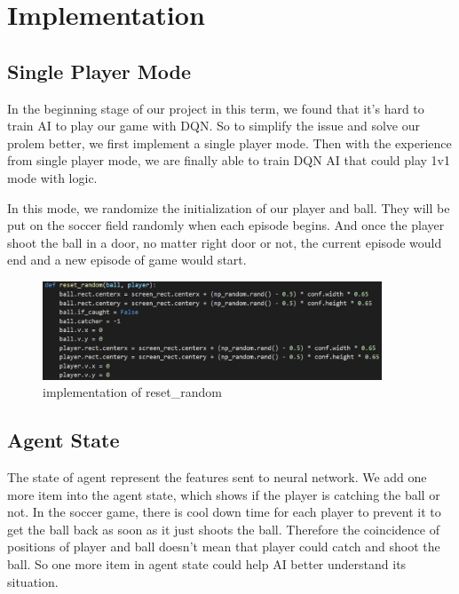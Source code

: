 \documentclass[12pt]{article}
\begin{document}

\section{Implementation}

\subsection{Single Player Mode}
In the beginning stage of our project in this term, we found that it's hard to train AI to play our game with DQN. So to simplify the issue and solve our prolem better, we first implement a single player mode. Then with the experience from single player mode, we are finally able to train DQN AI that could play 1v1 mode with logic.

In this mode, we randomize the initialization of our player and ball. They will be put on the soccer field randomly when each episode begins. And once the player shoot the ball in a door, no matter right door or not, the current episode would end and a new episode of game would start.
\begin{figure}[H]
	\begin{center}
		\includegraphics[width=0.9\textwidth]{reset_random}
		\caption{implementation of reset\_random}
	\end{center}
\end{figure}


\subsection{Agent State}
The state of agent represent the features sent to neural network. We add one more item into the agent state, which shows if the player is catching the ball or not. In the soccer game, there is cool down time for each player to prevent it to get the ball back as soon as it just shoots the ball. Therefore the coincidence of positions of player and ball doesn't mean that player could catch and shoot the ball. So one more item in agent state could help AI better understand its situation.
\end{document}
